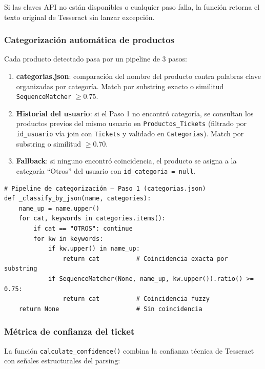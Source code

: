\documentclass[12pt, letterpaper]{article}
\newcommand{\campo}[1]{\texttt{#1}}
\begin{document}
Si las claves API no están disponibles o cualquier paso falla, la función
retorna el texto original de Tesseract sin lanzar excepción.

\subsubsection{Categorización automática de productos}

Cada producto detectado pasa por un pipeline de 3 pasos:

\begin{enumerate}
  \item \textbf{categorias.json}: comparación del nombre del producto contra
        palabras clave organizadas por categoría. Match por substring exacto
        o similitud \campo{SequenceMatcher} $\geq 0.75$.
  \item \textbf{Historial del usuario}: si el Paso 1 no encontró categoría,
        se consultan los productos previos del mismo usuario en
        \campo{Productos\_Tickets} (filtrado por \campo{id\_usuario} vía join
        con \campo{Tickets} y validado en \campo{Categorias}). Match por
        substring o similitud $\geq 0.70$.
  \item \textbf{Fallback}: si ninguno encontró coincidencia, el producto se
        asigna a la categoría ``Otros'' del usuario con \campo{id\_categoria = null}.
\end{enumerate}

\begin{lstlisting}
# Pipeline de categorización — Paso 1 (categorias.json)
def _classify_by_json(name, categories):
    name_up = name.upper()
    for cat, keywords in categories.items():
        if cat == "OTROS": continue
        for kw in keywords:
            if kw.upper() in name_up:
                return cat          # Coincidencia exacta por substring
            if SequenceMatcher(None, name_up, kw.upper()).ratio() >= 0.75:
                return cat          # Coincidencia fuzzy
    return None                     # Sin coincidencia
\end{lstlisting}

\subsubsection{Métrica de confianza del ticket}

La función \campo{calculate\_confidence()} combina la confianza técnica
de Tesseract con señales estructurales del parsing:
\end{document}

